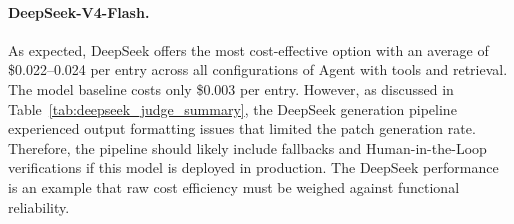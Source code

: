 \paragraph{DeepSeek-V4-Flash.} As expected, DeepSeek offers the most cost-effective option with an average of \$0.022--0.024 per entry across all configurations of Agent with tools and retrieval. The model baseline costs only \$0.003 per entry. 
However, as discussed in Table~\ref{tab:deepseek_judge_summary}, the DeepSeek generation pipeline experienced output formatting issues that limited the patch generation rate. 
Therefore, the pipeline should likely include fallbacks and Human-in-the-Loop verifications if this model is deployed in production. The DeepSeek performance is an example that raw cost efficiency must be weighed against functional reliability.

